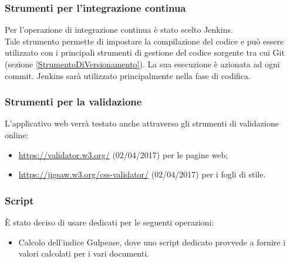 \documentclass[../NormeDiProgetto.tex]{subfiles}
\begin{document}
			\subsubsection{Strumenti per l'integrazione continua}\label{IntegrazioneContinua}
				Per l'operazione di integrazione continua è stato scelto Jenkins.\\
				Tale strumento permette di impostare la compilazione del codice e può essere utilizzato con
				i principali strumenti di gestione del codice sorgente tra cui Git (sezione
				\ref{StrumentoDiVersionamento}).
				La sua esecuzione è azionata ad ogni commit.
				Jenkins sarà utilizzato principalmente nella fase di codifica.
			\subsubsection{Strumenti per la validazione }
				L'applicativo web verrà testato anche attraverso gli strumenti di validazione online:
				\begin{itemize}
					\item \url{https://validator.w3.org/} (02/04/2017) per le pagine web;
					\item \url{https://jigsaw.w3.org/css-validator/} (02/04/2017) per i fogli di stile.
				\end{itemize}
			\subsubsection{Script}
				È stato deciso di usare  dedicati per le seguenti operazioni:
				\begin{itemize}
					\item Calcolo dell'indice Gulpease, dove uno script dedicato provvede a fornire i valori
					calcolati per i vari documenti.
				\end{itemize}
\end{document}
